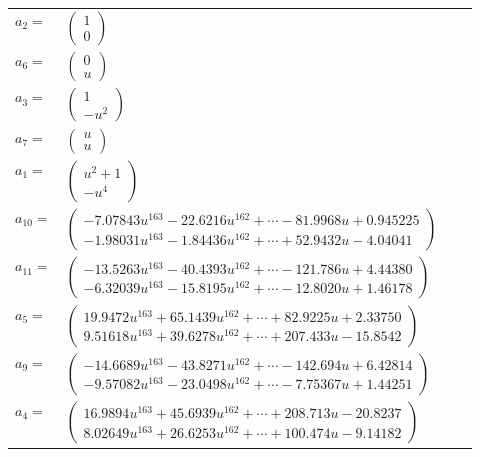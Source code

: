\documentclass[1p]{elsarticle_modified}
\theoremstyle{definition}
\begin{document}
\begin{tabular}{m{7pt} m{180pt} m{7pt} m{180pt} }
\flushright $a_{2}=$&$\begin{pmatrix}1\\0\end{pmatrix}$ \\
\flushright $a_{6}=$&$\begin{pmatrix}0\\u\end{pmatrix}$ \\
\flushright $a_{3}=$&$\begin{pmatrix}1\\- u^2\end{pmatrix}$ \\
\flushright $a_{7}=$&$\begin{pmatrix}u\\u\end{pmatrix}$ \\
\flushright $a_{1}=$&$\begin{pmatrix}u^2+1\\- u^4\end{pmatrix}$ \\
\flushright $a_{10}=$&$\begin{pmatrix}-7.07843 u^{163}-22.6216 u^{162}+\cdots-81.9968 u+0.945225\\-1.98031 u^{163}-1.84436 u^{162}+\cdots+52.9432 u-4.04041\end{pmatrix}$ \\
\flushright $a_{11}=$&$\begin{pmatrix}-13.5263 u^{163}-40.4393 u^{162}+\cdots-121.786 u+4.44380\\-6.32039 u^{163}-15.8195 u^{162}+\cdots-12.8020 u+1.46178\end{pmatrix}$ \\
\flushright $a_{5}=$&$\begin{pmatrix}19.9472 u^{163}+65.1439 u^{162}+\cdots+82.9225 u+2.33750\\9.51618 u^{163}+39.6278 u^{162}+\cdots+207.433 u-15.8542\end{pmatrix}$ \\
\flushright $a_{9}=$&$\begin{pmatrix}-14.6689 u^{163}-43.8271 u^{162}+\cdots-142.694 u+6.42814\\-9.57082 u^{163}-23.0498 u^{162}+\cdots-7.75367 u+1.44251\end{pmatrix}$ \\
\flushright $a_{4}=$&$\begin{pmatrix}16.9894 u^{163}+45.6939 u^{162}+\cdots+208.713 u-20.8237\\8.02649 u^{163}+26.6253 u^{162}+\cdots+100.474 u-9.14182\end{pmatrix}$ \\

\end{tabular}
\end{document}
